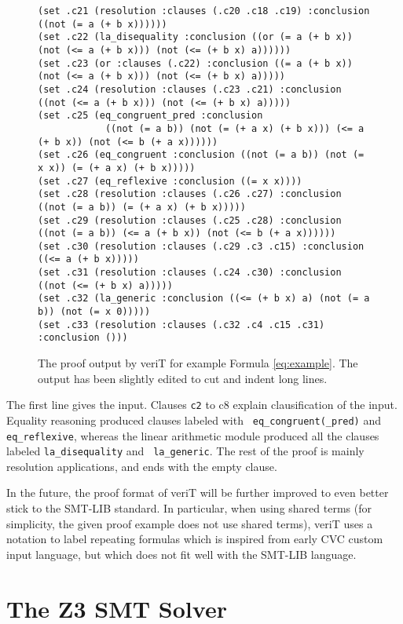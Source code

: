 \documentclass{llncs}
\begin{document}
\begin{figure}
{\begin{verbatim}
(set .c21 (resolution :clauses (.c20 .c18 .c19) :conclusion ((not (= a (+ b x))))))
(set .c22 (la_disequality :conclusion ((or (= a (+ b x)) (not (<= a (+ b x))) (not (<= (+ b x) a))))))
(set .c23 (or :clauses (.c22) :conclusion ((= a (+ b x)) (not (<= a (+ b x))) (not (<= (+ b x) a)))))
(set .c24 (resolution :clauses (.c23 .c21) :conclusion ((not (<= a (+ b x))) (not (<= (+ b x) a)))))
(set .c25 (eq_congruent_pred :conclusion
            ((not (= a b)) (not (= (+ a x) (+ b x))) (<= a (+ b x)) (not (<= b (+ a x))))))
(set .c26 (eq_congruent :conclusion ((not (= a b)) (not (= x x)) (= (+ a x) (+ b x)))))
(set .c27 (eq_reflexive :conclusion ((= x x))))
(set .c28 (resolution :clauses (.c26 .c27) :conclusion ((not (= a b)) (= (+ a x) (+ b x)))))
(set .c29 (resolution :clauses (.c25 .c28) :conclusion ((not (= a b)) (<= a (+ b x)) (not (<= b (+ a x))))))
(set .c30 (resolution :clauses (.c29 .c3 .c15) :conclusion ((<= a (+ b x)))))
(set .c31 (resolution :clauses (.c24 .c30) :conclusion ((not (<= (+ b x) a)))))
(set .c32 (la_generic :conclusion ((<= (+ b x) a) (not (= a b)) (not (= x 0)))))
(set .c33 (resolution :clauses (.c32 .c4 .c15 .c31) :conclusion ()))
\end{verbatim}
}
\caption{\label{fig:proofverit} The proof output by veriT for example Formula \ref{eq:example}.  The output has been slightly edited to cut and indent long lines.}
\end{figure}

The first line gives the input.  Clauses {\tt c2} to {c8} explain clausification
of the input.  Equality reasoning produced clauses labeled with {\tt
  eq\_congruent(\_pred)} and {\tt eq\_reflexive}, whereas the linear arithmetic
module produced all the clauses labeled {\tt la\_disequality} and {\tt
  la\_generic}.  The rest of the proof is mainly resolution applications, and ends with the empty clause.


In the future, the proof format of veriT will be further improved to even better
stick to the SMT-LIB standard.  In particular, when using shared terms (for
simplicity, the given proof example does not use shared terms), veriT uses a
notation to label repeating formulas which is inspired from early CVC custom
input language, but which does not fit well with the SMT-LIB language.

\section{The Z3 SMT Solver}
\label{sec:z3}
\end{document}
